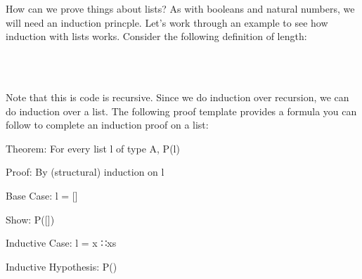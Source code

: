 \documentclass{lecturenotes}
\newcommand{\agdacons}{\textsf{∷}\xspace}
\begin{document}
\pagebreak

How can we prove things about lists? 
As with booleans and natural numbers, we will need an induction princple. 
Let's work through an example to see how induction with lists works.
Consider the following definition of length:

\begin{center}
    \begin{code}%
%
\>[8]\AgdaSpace{}%
\AgdaSymbol{:}\AgdaSpace{}%
\AgdaSpace{}%
\AgdaSymbol{\{}\AgdaSpace{}%
\AgdaSymbol{:}\AgdaSpace{}%
\AgdaSymbol{\}}\AgdaSpace{}%
\AgdaSymbol{->}\AgdaSpace{}%
\AgdaSpace{}%
\AgdaSpace{}%
\AgdaSymbol{->}\AgdaSpace{}%
\<%
\\
%
\>[8]\AgdaSpace{}%
\AgdaInductiveConstructor{[]}\AgdaSpace{}%
\AgdaSymbol{=}\AgdaSpace{}%
\<%
\\
%
\>[8]\AgdaSpace{}%
\AgdaSymbol{(}\AgdaSpace{}%
\AgdaSpace{}%
\AgdaSymbol{)}\AgdaSpace{}%
\AgdaSymbol{=}\AgdaSpace{}%
\AgdaSpace{}%
\AgdaSymbol{(}\AgdaSpace{}%
\AgdaSymbol{)}\<%
\end{code}
\end{center}

Note that this is code is recursive.
Since we do induction over recursion, we can do induction over a list. 
The following proof template provides a formula you can follow to complete an induction proof on a list:

\vspace{0.2in}

\noindent Theorem: For every list \textsf{l} of type \textsf{A}, P(\textsf{l})

\noindent Proof: By (structural) induction on \textsf{l} 

\vspace{0.1in}

\noindent Base Case: \textsf{l} = \textsf{[]} 

\noindent Show: P(\textsf{[]}) 

\vspace{0.1in}

\noindent Inductive Case: \textsf{l} = \textsf{x} \agdacons \textsf{xs} 

\noindent Inductive Hypothesis: P() 
\end{document}
